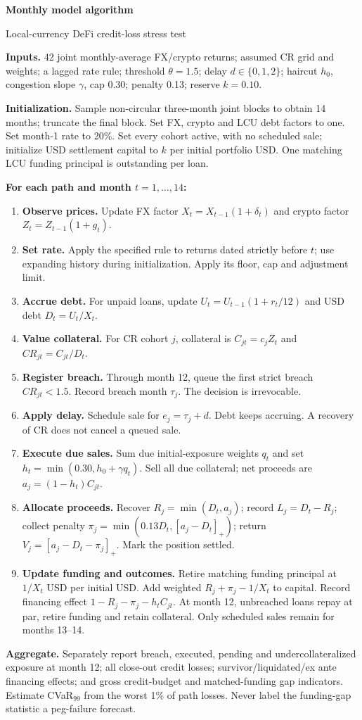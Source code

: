 \documentclass[11pt,a4paper]{article}
\begin{document}
\begin{center}{\Large\bfseries Monthly model algorithm}\par\small Local-currency DeFi credit-loss stress test\end{center}
\textbf{Inputs.} 42 joint monthly-average FX/crypto returns; assumed CR grid and weights; a lagged rate rule; threshold $\theta=1.5$; delay $d\in\{0,1,2\}$; haircut $h_0$, congestion slope $\gamma$, cap 0.30; penalty 0.13; reserve $k=0.10$.

\medskip
\textbf{Initialization.} Sample non-circular three-month joint blocks to obtain 14 months; truncate the final block. Set FX, crypto and LCU debt factors to one. Set month-1 rate to 20\%. Set every cohort active, with no scheduled sale; initialize USD settlement capital to $k$ per initial portfolio USD. One matching LCU funding principal is outstanding per loan.

\medskip
\textbf{For each path and month $t=1,\ldots,14$:}
\begin{enumerate}[leftmargin=*,itemsep=7pt]
\item \textbf{Observe prices.} Update FX factor $X_t=X_{t-1}(1+\delta_t)$ and crypto factor $Z_t=Z_{t-1}(1+g_t)$.
\item \textbf{Set rate.} Apply the specified rule to returns dated strictly before $t$; use expanding history during initialization. Apply its floor, cap and adjustment limit.
\item \textbf{Accrue debt.} For unpaid loans, update $U_t=U_{t-1}(1+r_t/12)$ and USD debt $D_t=U_t/X_t$.
\item \textbf{Value collateral.} For CR cohort $j$, collateral is $C_{jt}=c_jZ_t$ and $CR_{jt}=C_{jt}/D_t$.
\item \textbf{Register breach.} Through month 12, queue the first strict breach $CR_{jt}<1.5$. Record breach month $\tau_j$. The decision is irrevocable.
\item \textbf{Apply delay.} Schedule sale for $e_j=\tau_j+d$. Debt keeps accruing. A recovery of CR does not cancel a queued sale.
\item \textbf{Execute due sales.} Sum due initial-exposure weights $q_t$ and set $h_t=\min(0.30,h_0+\gamma q_t)$. Sell all due collateral; net proceeds are $a_j=(1-h_t)C_{jt}$.
\item \textbf{Allocate proceeds.} Recover $R_j=\min(D_t,a_j)$; record $L_j=D_t-R_j$; collect penalty $\pi_j=\min(0.13D_t,[a_j-D_t]_+)$; return $V_j=[a_j-D_t-\pi_j]_+$. Mark the position settled.
\item \textbf{Update funding and outcomes.} Retire matching funding principal at $1/X_t$ USD per initial USD. Add weighted $R_j+\pi_j-1/X_t$ to capital. Record financing effect $1-R_j-\pi_j-h_tC_{jt}$. At month 12, unbreached loans repay at par, retire funding and retain collateral. Only scheduled sales remain for months 13--14.
\end{enumerate}
\textbf{Aggregate.} Separately report breach, executed, pending and undercollateralized exposure at month 12; all close-out credit losses; survivor/liquidated/ex ante financing effects; and gross credit-budget and matched-funding gap indicators. Estimate CVaR$_{99}$ from the worst 1\% of path losses. Never label the funding-gap statistic a peg-failure forecast.
\end{document}
